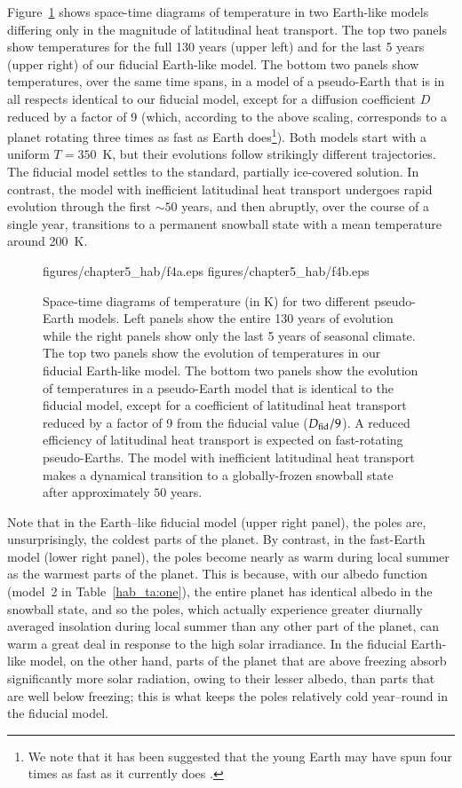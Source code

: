 Figure~\ref{hab_fig:temp maps} shows space-time diagrams of
temperature in two Earth-like models differing only in the magnitude
of latitudinal heat transport.  The top two panels show temperatures
for the full 130 years (upper left) and for the last 5 years (upper
right) of our fiducial Earth-like model.  The bottom two panels show
temperatures, over the same time spans, in a model of a pseudo-Earth
that is in all respects identical to our fiducial model, except for a
diffusion coefficient $D$ reduced by a factor of 9 (which, according
to the above scaling, corresponds to a planet rotating three times as
fast as Earth does\footnote{We note that it has been suggested that
the young Earth may have spun four times as fast as it currently does
\citep{canup2004}.}).  Both models start with a uniform $T=350$~K, but
their evolutions follow strikingly different trajectories.  The
fiducial model settles to the standard, partially ice-covered
solution.  In contrast, the model with inefficient latitudinal heat
transport undergoes rapid evolution through the first $\sim 50$ years,
and then abruptly, over the course of a single year, transitions to a
permanent snowball state with a mean temperature around 200~K.
\begin{figure}[p]
\plottwo
{figures/chapter5_hab/f4a.eps} %
{figures/chapter5_hab/f4b.eps} %
\caption[Space-time diagrams of temperature (in K) for two different
pseudo-Earth models.]{Space-time diagrams of temperature (in K) for
two different pseudo-Earth models.  Left panels show the entire 130
years of evolution while the right panels show only the last 5 years
of seasonal climate. The top two panels show the evolution of
temperatures in our fiducial Earth-like model. The bottom two panels
show the evolution of temperatures in a pseudo-Earth model that is
identical to the fiducial model, except for a coefficient of
latitudinal heat transport reduced by a factor of 9 from the fiducial
value ($D_{\rm fid}/9$). A reduced efficiency of latitudinal heat
transport is expected on fast-rotating pseudo-Earths.  The model with
inefficient latitudinal heat transport makes a dynamical transition to
a globally-frozen snowball state after approximately $50$ years.}
\label{hab_fig:temp maps}
\end{figure}
\afterpage{\clearpage}

Note that in the Earth--like fiducial model (upper right panel), the
poles are, unsurprisingly, the coldest parts of the planet.  By
contrast, in the fast-Earth model (lower right panel), the poles
become nearly as warm during local summer as the warmest parts of the
planet.  This is because, with our albedo function (model~2 in
Table~\ref{hab_ta:one}), the entire planet has identical albedo in
the snowball state, and so the poles, which actually experience
greater diurnally averaged insolation during local summer than any
other part of the planet, can warm a great deal in response to the
high solar irradiance.  In the fiducial Earth-like model, on the other
hand, parts of the planet that are above freezing absorb significantly
more solar radiation, owing to their lesser albedo, than parts that
are well below freezing; this is what keeps the poles relatively cold
year--round in the fiducial model.


